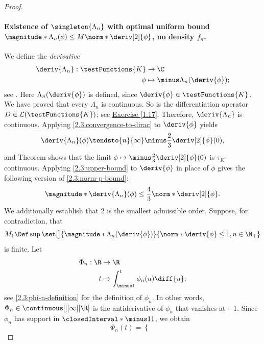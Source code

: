 \begin{proof}
\paragraph{Existence of $\singleton{\Lambda_n}$ with optimal uniform bound %
    $\magnitude*{\Lambda_n(\phi)}\leq M\norm*{\deriv[2]{\phi}}$, no density $f_n$.} %
%
We define the \emph{derivative}
% 
\begin{align}
  \deriv{\Lambda_n}: \testFunctions{K} &\to \C\\
  \phi &\mapsto \minus \Lambda_n(\deriv{\phi});  \nonumber
\end{align}
% 
see . Here $\Lambda_n(\deriv{\phi})$ is defined, since $\deriv{\phi} \in \testFunctions{K}$. We have %
proved that every $\Lambda_n$ is continuous. So is the differentiation operator $D \in \mathcal{L}(\testFunctions{K})$; see %
\hyperref[1.17]{Exercise [1.17]}. Therefore, $\deriv{\Lambda_n}$ is continuous. Applying \eqref{2.3:convergence-to-dirac} to %
$\deriv{\phi}$ yields %
% 
\begin{equation}
  \deriv{\Lambda_n}(\phi) \tendsto{n}{\infty} \minus \frac{2}{3} \deriv[2]{\phi}(0), 
\end{equation}
% 
and Theorem  shows that the limit $\phi \mapsto \minus \frac{2}{3} \deriv[2]{\phi}(0)$ is $\tau_K$-continuous. 
Applying \eqref{2.3:upper-bound} to $\deriv{\phi}$ in place of $\phi$ gives the following version of %
\eqref{2.3:norm-p-bound}:
% 
\begin{equation}
  \magnitude*{\deriv{\Lambda_n}(\phi)} \leq \frac{4}{3} \norm*{\deriv[2]{\phi}}.
\end{equation}
% 
We additionally establish that $2$ is the smallest admissible order. Suppose, for contradiction, that %
% 
\begin{equation}
  M_1 \Def \sup\set[\big]{\magnitude*{\Lambda_n(\deriv{\phi})}}{\norm*{\deriv{\phi}} \leq 1, n \in \N_+}
\end{equation}
% 
is finite. Let 
%
\begin{align}
  \Phi_n: \R &\to \R \\
  t &\mapsto \int_{\minus 1}^{t} \phi_n(u) \diff{u}; \nonumber
\end{align}
%
see \eqref{2.3:phi-n-definition} for the definition of $\phi_n$. In other words, %
$\Phi_n \in \continuous[][\infty][\R]$ is the %
antiderivative of $\phi_n$ that vanishes at $\minus 1$. Since $\phi_n$ has support in $\closedInterval*{\minus 1}{1}$, %
we obtain 
% 
\begin{equation}
  \Phi_n(t) = \begin{cases}

\end{cases}
\end{equation}
\end{proof}
